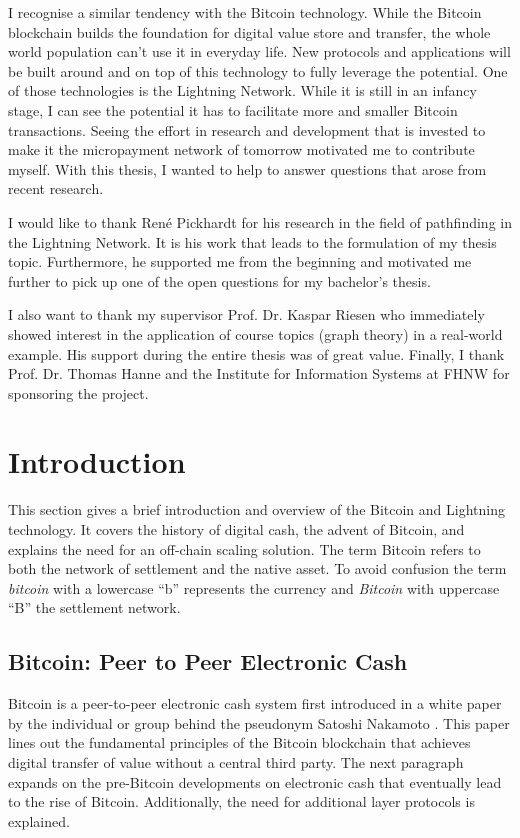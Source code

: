 \documentclass[final]{fhnwreport}       %
\begin{document}
I recognise a similar tendency with the Bitcoin technology. While the Bitcoin blockchain builds the foundation for digital value store and transfer, the whole world population can't use it in everyday life. New protocols and applications will be built around and on top of this technology to fully leverage the potential. One of those technologies is the Lightning Network. While it is still in an    infancy stage, I can see the potential it has to facilitate more and smaller Bitcoin transactions. Seeing the effort in research and development that is invested to make it the micropayment network of tomorrow motivated me to contribute myself. With this thesis, I wanted to help to answer questions that arose from recent research.

I would like to thank René Pickhardt for his research in the field of pathfinding in the Lightning Network. It is his work that leads to the formulation of my thesis topic. Furthermore, he supported me from the beginning and motivated me further to pick up one of the open questions for my bachelor's thesis.

I also want to thank my supervisor Prof. Dr. Kaspar Riesen who immediately showed interest in the application of course topics (graph theory) in a real-world example. His support during the entire thesis was of great value. Finally, I thank Prof. Dr. Thomas Hanne and the Institute for Information Systems at FHNW for sponsoring the project.

\clearpage
{}
\section{Introduction} 
This section gives a brief introduction and overview of the Bitcoin and Lightning technology. It covers the history of digital cash, the advent of Bitcoin, and explains the need for an off-chain scaling solution. The term Bitcoin refers to both the network of settlement and the native asset. To avoid confusion the term \emph{bitcoin} with a lowercase ``b'' represents the currency and \emph{Bitcoin} with uppercase ``B'' the settlement network.

\subsection{Bitcoin: Peer to Peer Electronic Cash}\label{subsec:peertopeer}
Bitcoin is a peer-to-peer electronic cash system first introduced in a white paper by the individual or group behind the pseudonym Satoshi Nakamoto \citep{nakamoto_bitcoin_2008}. This paper lines out the fundamental principles of the Bitcoin \gls{blockchain} that achieves digital transfer of value without a central third party. The next paragraph expands on the pre-Bitcoin developments on electronic cash that eventually lead to the rise of Bitcoin. Additionally, the need for additional layer protocols is explained.
\end{document}
